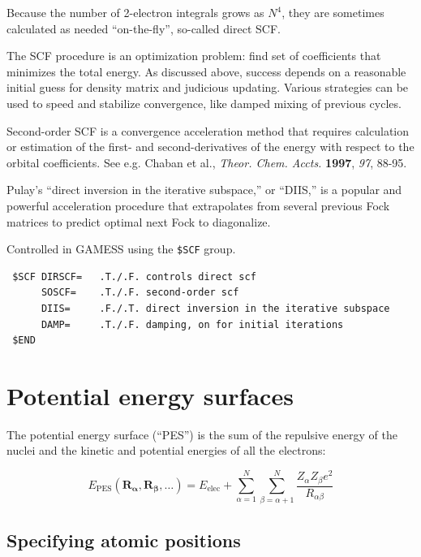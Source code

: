 \documentclass[11pt]{article}
\begin{document}
Because the number of 2-electron integrals grows as \(N^4\), they are sometimes calculated as needed ``on-the-fly'', so-called direct SCF.

The SCF procedure is an optimization problem: find set of coefficients that minimizes the total energy. As discussed above, success depends on a reasonable initial guess for density matrix and judicious updating. Various strategies can be used to speed and stabilize convergence, like damped mixing of previous cycles.

Second-order SCF is a convergence acceleration method that requires calculation or estimation of the first- and second-derivatives of the energy with respect to the orbital coefficients. See e.g. Chaban et al., \emph{Theor. Chem. Accts.} \textbf{1997}, \emph{97}, 88-95.

Pulay's ``direct inversion in the iterative subspace,'' or ``DIIS,'' is a popular and powerful acceleration procedure that extrapolates from several previous Fock matrices to predict optimal next Fock to diagonalize.

Controlled in GAMESS using the \texttt{\$SCF} group.

\begin{verbatim}
 $SCF DIRSCF=   .T./.F. controls direct scf
      SOSCF=    .T./.F. second-order scf
      DIIS=     .F./.T. direct inversion in the iterative subspace
      DAMP=     .T./.F. damping, on for initial iterations
 $END
\end{verbatim}
\newpage
\section{Potential energy surfaces}
\label{sec:org5559dfa}
The potential energy surface (``PES'') is the sum of the repulsive energy of the nuclei and the kinetic and potential energies of all the electrons:
\begin{center}
\begin{equation}
E_\text{PES}(\mathbf{R_\alpha},\mathbf{R_\beta},\ldots) =E_\text{elec} +\sum_{\alpha=1}^N \sum_{\beta =\alpha +1}^N \frac{Z_\alpha Z_\beta e^2}{R_{\alpha \beta}}
\end{equation}
\end{center}

\subsection{Specifying atomic positions}
\label{sec:orgf157bc0}
\end{document}
